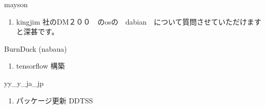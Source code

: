 \begin{prework}{ mayson }
  \begin{enumerate}
  \item kingjim 社のDM２００　のosの　dabian　について質問させていただけますと深甚です。
  \end{enumerate}
\end{prework}

\begin{prework}{ BurnDuck (nabaua) }
  \begin{enumerate}
  \item tensorflow 構築
  \end{enumerate}
\end{prework}

\begin{prework}{ yy\_y\_ja\_jp }
  \begin{enumerate}
  \item パッケージ更新 DDTSS
  \end{enumerate}
\end{prework}
